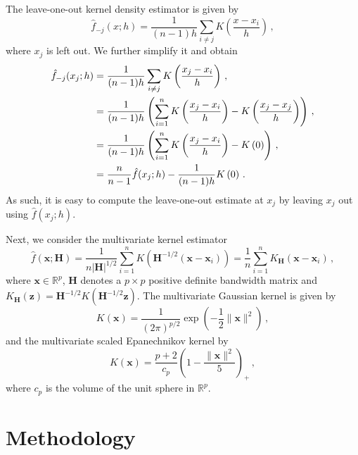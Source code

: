\documentclass[letter,12pt]{article}
\begin{document}
The leave-one-out kernel density estimator is given by
\begin{equation}\label{eq:kde9}
    \hat{f}_{-j}(x;h) = \frac{1}{(n-1)h}\sum_{i \neq j} K\left(\frac{x-x_i}{h}\right)\, ,  
\end{equation}
where $x_j$ is left out. We further simplify it and obtain %
\begin{align}\label{eq:kde10}
    \hat{f}_{-j}(x_j;h) & = \frac{1}{(n-1)h}\sum_{i \neq j} K\left(\frac{x_j-x_i}{h}\right)\, , \notag \\
    & = \frac{1}{(n-1)h} \left(\sum_{i = 1}^n K\left(\frac{x_j-x_i}{h}\right) - K\left(\frac{x_j-x_j}{h}\right)  \right) \, , \notag  \\
    & = \frac{1}{(n-1)h} \left(\sum_{i = 1}^n K\left(\frac{x_j-x_i}{h}\right) - K\left(0\right)  \right) \, , \notag  \\
    & = \frac{n}{n-1} \hat{f}(x_j;h) - \frac{1}{(n-1)h} K\left(0\right) \, .
\end{align}
As such, it is easy to compute the leave-one-out estimate at $x_j$ by leaving $x_j$ out using $\hat{f}(x_j;h)$. 

Next, we consider the multivariate kernel estimator
\begin{equation}\label{eq:kde6}
    \hat{f}\left(\bm{x}; \bm{H}\right) = \frac{1}{n|\bm{H}|^{1/2}} \sum_{i=1}^n K\left(\bm{H}^{-1/2}(\bm{x} -\bm{x}_i) \right) = \frac{1}{n} \sum_{i=1}^n K_{\bm{H}}\left(\bm{x} -\bm{x}_i \right)\, ,
\end{equation}
where $\mathbf{x} \in \mathbb{R}^p$, $\bm{H}$ denotes a $ p \times p$ positive definite bandwidth matrix and $K_{\bm{H}}(\bm{z}) = \bm{H}^{-1/2} K(\bm{H}^{-1/2} \bm{z})$. The multivariate Gaussian kernel is given by
\begin{equation}\label{eq:kde7}
    K(\bm{x}) = \frac{1}{(2\pi)^{p/2}} \exp\left( -\frac{1}{2} \| \bm{x} \| ^2\right)\, , 
\end{equation}
and the multivariate scaled Epanechnikov kernel by
\begin{equation}\label{eq:kde8}
    K(\bm{x}) = \frac{p+2}{c_p}\left(1 - \frac{\| \bm{x} \| ^2}{5} \right)_+ \, , 
\end{equation}
where $c_p$ is the volume of the unit sphere in $\mathbb{R}^p$.


\section{Methodology}\label{sec:lookout}
\end{document}
